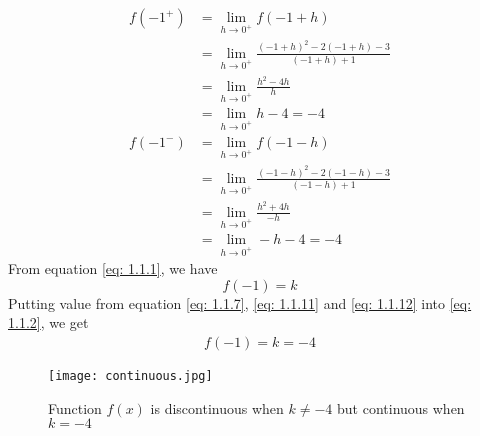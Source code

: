 \documentclass[journal,12pt,twocolumn]{IEEEtran}
\renewcommand\thesection{\arabic{section}}
\begin{document}
\begin{enumerate}[label=\thesection.\arabic*.,ref=\thesection.\theenumi]
            \begin{align}
            f(-1^+) &=\lim_{h\to 0^+}f(-1+h)\\ 
                    &=\lim_{h\to 0^+}\frac{(-1+h)^2-2(-1+h)-3}{(-1+h)+1}\\
                    &=\lim_{h\to 0^+}\frac{h^2-4h}{h} \\
                    &= \lim_{h\to 0^+}h-4 =-4 \label{eq: 1.1.7}
            \end{align}
            \begin{align}
            f(-1^-) &=\lim_{h\to 0^+}f(-1-h)\\ 
                    &=\lim_{h\to 0^+}\frac{(-1-h)^2-2(-1-h)-3}{(-1-h)+1}\\
                    &=\lim_{h\to 0^+}\frac{h^2+4h}{-h} \\
                    &= \lim_{h\to 0^+}-h-4 =-4 \label{eq: 1.1.11}
            \end{align}
            From equation \eqref{eq: 1.1.1}, we have\\
            \begin{equation}
                f(-1)=k \label{eq: 1.1.12}
            \end{equation}
            Putting value from equation \eqref{eq: 1.1.7}, \eqref{eq: 1.1.11} and \eqref{eq: 1.1.12} into \eqref{eq: 1.1.2}, we get\\
            \begin{align}
                f(-1)=k=-4
            \end{align}
            \begin{figure}[!ht]
                \centering
                \texttt{[image: continuous.jpg]}
                \caption{Function $f(x)$ is discontinuous when $k\neq-4$ but continuous when $k=-4$}
                \label{fig: 1.1.1}
            \end{figure}


\end{enumerate}
\end{document}
